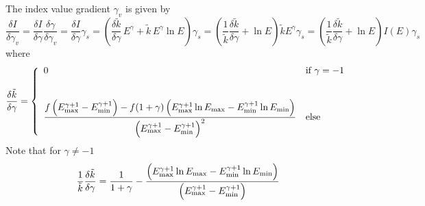 \documentclass{article}[12pt,a4]
\begin{document}
The index value gradient $\gamma_v$ is given by
\begin{equation}
\frac{\delta I}{\delta \gamma_v} =
  \frac{\delta I}{\delta \gamma} \frac{\delta \gamma}{\delta \gamma_v} = 
  \frac{\delta I}{\delta \gamma} \gamma_s = 
  \left( \frac{\delta \tilde{k}}{\delta \gamma} \, E^{\gamma} + \tilde{k} \, E^{\gamma} \ln E \right)  \gamma_s =
  \left( \frac{1}{\tilde{k}} \frac{\delta \tilde{k}}{\delta \gamma} + \ln E \right) \tilde{k} E^{\gamma} \gamma_s =
  \left( \frac{1}{\tilde{k}} \frac{\delta \tilde{k}}{\delta \gamma} + \ln E \right) I(E) \gamma_s
\end{equation}
where
\begin{equation}
   \frac{\delta \tilde{k}}{\delta \gamma} = \left \{
   \begin{array}{l l}
     \displaystyle
     0 & \mbox{if $\gamma = -1$} \\
     \\
     \\
     \displaystyle
      \frac{f \left( E_{\rm max}^{\gamma+1}-E_{\rm min}^{\gamma+1} \right) -
              f (1+\gamma) \left( E_{\rm max}^{\gamma+1} \ln E_{\rm max} - 
                                      E_{\rm min}^{\gamma+1} \ln E_{\rm min} \right)}
              {\left( E_{\rm max}^{\gamma+1}-E_{\rm min}^{\gamma+1} \right)^2}
         & \mbox{else}
   \end{array}
   \right .
\end{equation}
Note that for $\gamma \ne -1$
\begin{equation}
\frac{1}{\tilde{k}} \frac{\delta \tilde{k}}{\delta \gamma} =
  \frac{1}{1+\gamma} -
  \frac{\left( E_{\rm max}^{\gamma+1} \ln E_{\rm max} - 
                    E_{\rm min}^{\gamma+1} \ln E_{\rm min} \right)}
          {\left( E_{\rm max}^{\gamma+1}-E_{\rm min}^{\gamma+1} \right)}
\end{equation}
\end{document}
